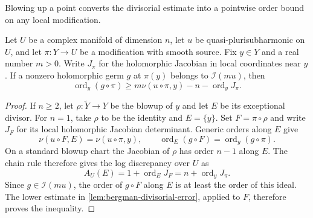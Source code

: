 Blowing up a point converts the divisorial estimate into a pointwise order bound on any local modification.

\begin{lemma}\label{lem:ideal-modification-lelong-loss}
Let $U$ be a complex manifold of dimension $n$, let $u$ be quasi-plurisubharmonic on $U$, and let $\pi\colon Y\to U$ be a modification with smooth source. Fix $y\in Y$ and a real number $m>0$. Write $J_\pi$ for the holomorphic Jacobian in local coordinates near $y$. If a nonzero holomorphic germ $g$ at $\pi(y)$ belongs to $\mathcal I(mu)$, then
\[
 \operatorname{ord}_y(g\circ\pi)
       \geq m\nu(u\circ\pi,y)-n-\operatorname{ord}_yJ_\pi.
\]
\end{lemma}
\begin{proof}
If $n\geq2$, let $\rho\colon\widetilde Y\to Y$ be the blowup of $y$ and let $E$ be its exceptional divisor. For $n=1$, take $\rho$ to be the identity and $E=\{y\}$. Set $F=\pi\circ\rho$ and write $J_F$ for its local holomorphic Jacobian determinant. Generic orders along $E$ give
\[
 \nu(u\circ F,E)=\nu(u\circ\pi,y),\qquad
 \operatorname{ord}_E(g\circ F)=\operatorname{ord}_y(g\circ\pi).
\]
On a standard blowup chart the Jacobian of $\rho$ has order $n-1$ along $E$. The chain rule therefore gives the log discrepancy over $U$ as
\[
 A_U(E)=1+\operatorname{ord}_E J_F
       =n+\operatorname{ord}_yJ_\pi.
\]
Since $g\in\mathcal I(mu)$, the order of $g\circ F$ along $E$ is at least the order of this ideal. The lower estimate in \cref{lem:bergman-divisorial-error}, applied to $F$, therefore proves the inequality.
\end{proof}

